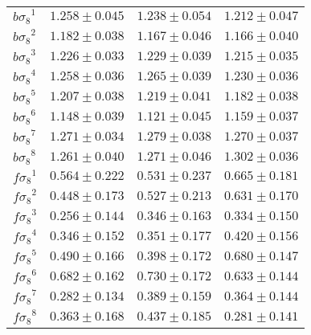 \documentclass[astrosymb,twocolumn]{aastex631}
\newcommand{\bs}{\ensuremath{b\sigma_8}}
\renewcommand{\fs}{\ensuremath{f\!\sigma_8}}
\begin{document}
\begin{table}
\begin{tabularx}{\columnwidth}{X c c c}
    $\bs^1$ &$1.258\pm0.045$ & $1.238\pm0.054$ & $1.212\pm0.047$ \\
    $\bs^2$ & $1.182\pm0.038$ & $1.167\pm0.046$ & $1.166\pm 0.040$ \\
        $\bs^3$ & $1.226\pm0.033$ & $1.229\pm0.039$ & $1.215\pm0.035$ \\
            $\bs^4$ & $1.258\pm0.036$ & $1.265\pm0.039$ & $1.230\pm0.036$ \\
            $\bs^5$ & $1.207\pm0.038$ & $1.219\pm0.041$ & $1.182\pm0.038$ \\
            $\bs^6$ & $1.148\pm0.039$ & $1.121\pm0.045$ & $1.159\pm0.037$ \\
            $\bs^7$ & $1.271\pm0.034$ & $1.279\pm0.038$ & $1.270\pm0.037$ \\
            $\bs^8$ & $1.261\pm0.040$ & $1.271\pm0.046$ & $1.302\pm0.036$ \\
    \hline

    $\fs^1$ & $0.564\pm 0.222$ & $0.531\pm0.237$ & $0.665\pm0.181$ \\
    $\fs^2$ & $0.448\pm0.173$ & $0.527\pm0.213$ & $0.631\pm 0.170$ \\
        $\fs^3$ & $0.256\pm0.144$ & $0.346\pm 0.163$ & $0.334\pm0.150$ \\
            $\fs^4$ & $0.346\pm0.152$ & $0.351\pm0.177$ & $0.420\pm 0.156$ \\
            $\fs^5$ & $0.490\pm 0.166$ & $0.398\pm 0.172$ & $0.680\pm 0.147$ \\
            $\fs^6$ & $0.682\pm 0.162$ & $0.730\pm 0.172$ & $0.633\pm 0.144$ \\
            $\fs^7$ & $0.282\pm 0.134$ & $0.389\pm 0.159$ & $0.364\pm 0.144$ \\   
            $\fs^8$ & $0.363\pm 0.168$ & $0.437\pm 0.185$ & $0.281\pm 0.141$ \\ 
    \hline
\end{tabularx}
\label{tab:results_lowz_cmass}
\end{table}
\end{document}
